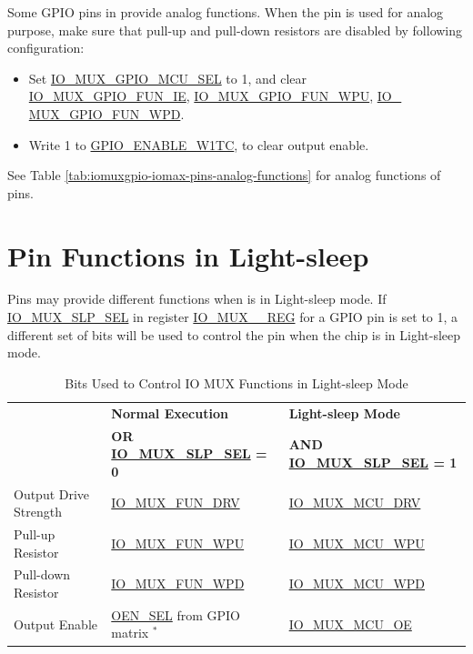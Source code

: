 \documentclass[main\_\_EN.tex]{subfiles}
\begin{document}
Some GPIO pins in \chipname{} provide analog functions. When the pin is used for analog purpose, make sure that pull-up and pull-down resistors are disabled by following configuration:

\begin{itemize}
    \item Set \hyperref[fielddesc:IOMUXGPIONMCUSEL]{IO\_MUX\_GPIO\_MCU\_SEL} to 1, and clear \hyperref[fielddesc:IOMUXGPIONFUNIE]{IO\_MUX\_GPIO\_FUN\_IE}, \hyperref[fielddesc:IOMUXGPIONFUNIE]{IO\_MUX\_GPIO\_FUN\_WPU}, \hyperref[fielddesc:IOMUXGPIONFUNIE]{IO\_\\MUX\_GPIO\_FUN\_WPD}.
    \item Write 1 to \hyperref[fielddesc:GPIOENABLEW1TC]{GPIO\_ENABLE\_W1TC\regindex{[n]}}, to clear output enable.
\end{itemize}
See Table \ref{tab:iomuxgpio-iomax-pins-analog-functions} for analog functions of \chipname{} pins.

\section{Pin Functions in Light-sleep}

Pins may provide different functions when \chipname{} is in Light-sleep mode. If \hyperref[fielddesc:IOMUXGPIONSLPSEL]{IO\_MUX\_SLP\_SEL} in register \hyperref[regdesc:IOMUXGPIONREG]{IO\_MUX\_\_REG} for a GPIO pin is set to 1, a different set of bits will be used to control the pin when the chip is in Light-sleep mode.

\begin{longtable}[c]{|p{3.5cm}|p{4.5cm}|p{4.5cm}|}
\caption{Bits Used to Control IO MUX Functions in Light-sleep Mode}
\label{tab:iomuxgpio-pin-function-register-light-sleep-mode} \\
    \hline
    \rowcolor{lightgray}
   & \textbf{Normal Execution} & \textbf{Light-sleep Mode} \\
    \rowcolor{lightgray}
   \multirow{-2}{*}{\textbf{IO MUX Functions}}  & \textbf{OR \hyperref[fielddesc:IOMUXGPIONSLPSEL]{IO\_MUX\_SLP\_SEL} = 0} & \textbf{AND \hyperref[fielddesc:IOMUXGPIONSLPSEL]{IO\_MUX\_SLP\_SEL} = 1} \\
    \hline
Output Drive Strength & \hyperref[fielddesc:IOMUXGPIONFUNDRV]{IO\_MUX\_FUN\_DRV} & \hyperref[fielddesc:IOMUXGPIONMCUDRV]{IO\_MUX\_MCU\_DRV} \\
\hline
Pull-up Resistor & \hyperref[fielddesc:IOMUXGPIONFUNWPU]{IO\_MUX\_FUN\_WPU} & \hyperref[fielddesc:IOMUXGPIONMCUWPU]{IO\_MUX\_MCU\_WPU} \\
\hline
Pull-down Resistor & \hyperref[fielddesc:IOMUXGPIONFUNWPD]{IO\_MUX\_FUN\_WPD} & \hyperref[fielddesc:IOMUXGPIONMCUWPD]{IO\_MUX\_MCU\_WPD} \\
\hline
Output Enable & \hyperref[fielddesc:GPIOFUNCNOENSEL]{OEN\_SEL} from GPIO matrix $^{*}$  & \hyperref[fielddesc:IOMUXGPIONMCUOE]{IO\_MUX\_MCU\_OE} \\
\hline
\end{longtable}
\end{document}
